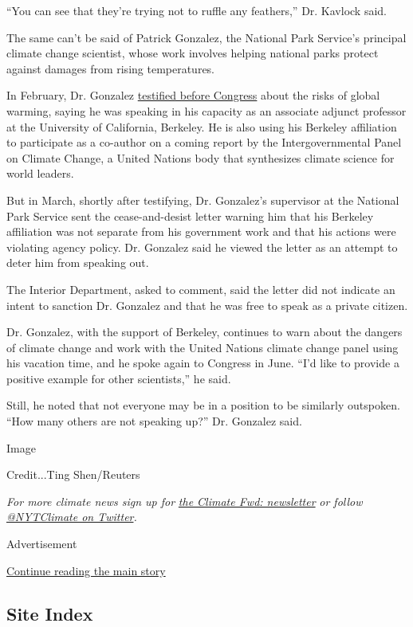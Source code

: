 ``You can see that they're trying not to ruffle any feathers,'' Dr.
Kavlock said.

The same can't be said of Patrick Gonzalez, the National Park Service's
principal climate change scientist, whose work involves helping national
parks protect against damages from rising temperatures.

In February, Dr. Gonzalez
\href{https://naturalresources.house.gov/download/patrick-gonzalez-testimony}{testified
before Congress} about the risks of global warming, saying he was
speaking in his capacity as an associate adjunct professor at the
University of California, Berkeley. He is also using his Berkeley
affiliation to participate as a co-author on a coming report by the
Intergovernmental Panel on Climate Change, a United Nations body that
synthesizes climate science for world leaders.

But in March, shortly after testifying, Dr. Gonzalez's supervisor at the
National Park Service sent the cease-and-desist letter warning him that
his Berkeley affiliation was not separate from his government work and
that his actions were violating agency policy. Dr. Gonzalez said he
viewed the letter as an attempt to deter him from speaking out.

The Interior Department, asked to comment, said the letter did not
indicate an intent to sanction Dr. Gonzalez and that he was free to
speak as a private citizen.

Dr. Gonzalez, with the support of Berkeley, continues to warn about the
dangers of climate change and work with the United Nations climate
change panel using his vacation time, and he spoke again to Congress in
June. ``I'd like to provide a positive example for other scientists,''
he said.

Still, he noted that not everyone may be in a position to be similarly
outspoken. ``How many others are not speaking up?'' Dr. Gonzalez said.

Image

Credit...Ting Shen/Reuters

\emph{For more climate news sign up for}
\href{https://www.nytimes3xbfgragh.onion/newsletters/climate-change}{\emph{the
Climate Fwd: newsletter}} \emph{or follow}
\href{https://twitter.com/nytclimate}{\emph{@NYTClimate on
Twitter}}\emph{.}

Advertisement

\protect\hyperlink{after-bottom}{Continue reading the main story}

\hypertarget{site-index}{%
\subsection{Site Index}\label{site-index}}

